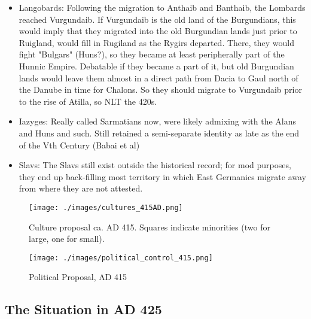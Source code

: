 \documentclass{article}
\begin{document}
\begin{itemize}
		\item Langobards:\newline
		Following the migration to Anthaib and Banthaib, the Lombards reached Vurgundaib.
		If Vurgundaib is the old land of the Burgundians, this would imply that they migrated into the old Burgundian lands just prior to Ruigland, would fill in Rugiland as the Rygirs departed.
		There, they would fight "Bulgars" (Huns?), so they became at least peripherally part of the Hunnic Empire.
		Debatable if they became a part of it, but old Burgundian lands would leave them almost in a direct path from Dacia to Gaul north of the Danube in time for Chalons.
		So they should migrate to Vurgundaib prior to the rise of Atilla, so NLT the 420s.
		
		\item Iazyges:\newline
		Really called Sarmatians now, were likely admixing with the Alans and Huns and such.
		Still retained a semi-separate identity as late as the end of the Vth Century (Babai et al)
		
		\item Slavs:\newline
		The Slavs still exist outside the historical record; for mod purposes, they end up back-filling most territory in which East Germanics migrate away from where they are not attested.
	\end{itemize}
	
	\newpage
	\begin{figure}[h!]
		\centering
		\texttt{[image: ./images/cultures\_415AD.png]}
		\caption{Culture proposal ca. AD 415. Squares indicate minorities (two for large, one for small).}
	\end{figure}
	
	\begin{figure}[h!]
		\centering
		\texttt{[image: ./images/political\_control\_415.png]}
		\caption{Political Proposal, AD 415}
	\end{figure}
	
	\newpage
	
	\subsection{The Situation in AD 425}
	\label{sec:timeline:subsec:425}
	
\end{document}
